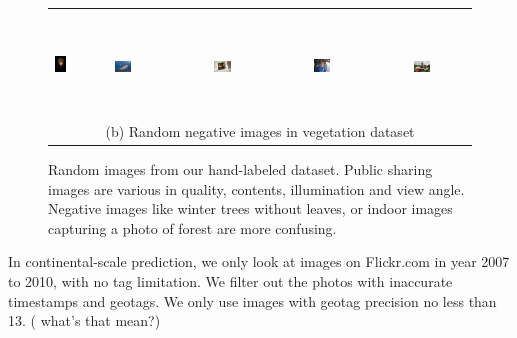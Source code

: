\documentclass[10pt,journal,compsoc]{IEEEtran}
\begin{document}
\begin{figure}[th]
{{\begin{center}
\begin{tabular}{@{}c@{\,\,\,}c@{\,\,\,}c@{\,\,\,}c@{\,\,\,}c@{\,\,\,}}
\\[-6pt]
\hline
\\[-6pt]
\includegraphics[height=1in]{imggrid/datasetnega/6.jpg} &
\includegraphics[width=0.19\textwidth]{imggrid/datasetnega/7.jpg} &
\includegraphics[width=0.19\textwidth]{imggrid/datasetnega/8.jpg} &
\includegraphics[width=0.19\textwidth]{imggrid/datasetnega/9.jpg} &
\includegraphics[width=0.19\textwidth]{imggrid/datasetnega/10.jpg} \\
\multicolumn{5}{c}{(b) Random negative images in vegetation dataset} \\
\end{tabular}
\end{center}
}}
\caption{Random images from our hand-labeled dataset. Public sharing images are various in quality, contents, illumination and view angle.
Negative images like winter trees without leaves, or indoor images capturing a photo of forest are more confusing.}
\label{fig:dataset}
\end{figure}


In continental-scale prediction, we only look at images on Flickr.com in year 2007 to 2010, with no tag limitation. We filter out the photos with inaccurate timestamps and geotags. We only use images with geotag precision no less than 13. ( what's that mean?) 
\end{document}
